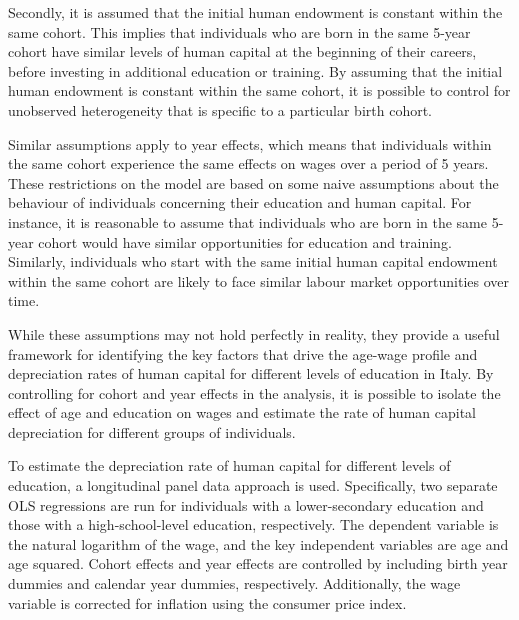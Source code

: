 \documentclass[12pt]{article}
\begin{document}
\par
Secondly, it is assumed that the initial human endowment is constant within the same cohort. This implies that
individuals who are born in the same 5-year cohort have similar levels of human capital at the beginning of their
careers, before investing in additional education or training. By assuming that the initial human endowment is constant
within the same cohort, it is possible to control for unobserved heterogeneity that is specific to a particular birth
cohort.

\par
Similar assumptions apply to year effects, which means that individuals within the same cohort experience the same
effects on wages over a period of 5 years. These restrictions on the model are based on some naive assumptions about the
behaviour of individuals concerning their education and human capital. For instance, it is reasonable to assume that
individuals who are born in the same 5-year cohort would have similar opportunities for education and training.
Similarly, individuals who start with the same initial human capital endowment within the same cohort are likely to face
similar labour market opportunities over time.

\par
While these assumptions may not hold perfectly in reality, they provide a useful framework for identifying the key
factors that drive the age-wage profile and depreciation rates of human capital for different levels of education in
Italy. By controlling for cohort and year effects in the analysis, it is possible to isolate the effect of age and
education on wages and estimate the rate of human capital depreciation for different groups of individuals.

\par
To estimate the depreciation rate of human capital for different levels of education, a longitudinal panel data approach
is used. Specifically, two separate OLS regressions are run for individuals with a lower-secondary education and those
with a high-school-level education, respectively. The dependent variable is the natural logarithm of the wage, and the
key independent variables are age and age squared. Cohort effects and year effects are controlled by including birth
year dummies and calendar year dummies, respectively. Additionally, the wage variable is corrected for inflation using
the consumer price index.
\par
\end{document}
